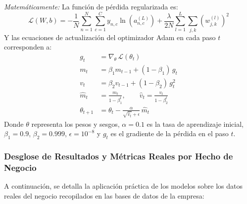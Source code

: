 \documentclass{article}
\begin{document}
\textit{Matemáticamente:} La función de pérdida regularizada es:
\begin{equation}
    \mathcal{L}(W, b) = -\frac{1}{N} \sum_{n=1}^{N} \sum_{c=1}^{C} y_{n,c} \ln\!\left(a_{n,c}^{(L)}\right) + \frac{\lambda}{2N} \sum_{l=1}^{L} \sum_{j,k} \!\left(w_{j,k}^{(l)}\right)^{\!2}
\end{equation}
Y las ecuaciones de actualización del optimizador Adam en cada paso $t$ corresponden a:
\begin{align}
    g_t &= \nabla_{\theta}\, \mathcal{L}(\theta_t) \tag{Gradiente del error}\\
    m_t &= \beta_1 m_{t-1} + (1 - \beta_1)\, g_t \tag{Promedio móvil de gradientes}\\
    v_t &= \beta_2 v_{t-1} + (1 - \beta_2)\, g_t^2 \tag{Promedio móvil de varianza}\\
    \hat{m}_t &= \frac{m_t}{1 - \beta_1^t}, \qquad \hat{v}_t = \frac{v_t}{1 - \beta_2^t} \tag{Corrección de sesgo inicial}\\
    \theta_{t+1} &= \theta_t - \frac{\alpha}{\sqrt{\hat{v}_t} + \epsilon}\, \hat{m}_t \tag{Actualización de parámetros}
\end{align}
Donde $\theta$ representa los pesos y sesgos, $\alpha = 0.1$ es la tasa de aprendizaje inicial, $\beta_1 = 0.9$, $\beta_2 = 0.999$, $\epsilon = 10^{-8}$ y $g_t$ es el gradiente de la pérdida en el paso $t$.

\subsubsection{Desglose de Resultados y Métricas Reales por Hecho de Negocio}
A continuación, se detalla la aplicación práctica de los modelos sobre los datos reales del negocio recopilados en las bases de datos de la empresa:
\end{document}
